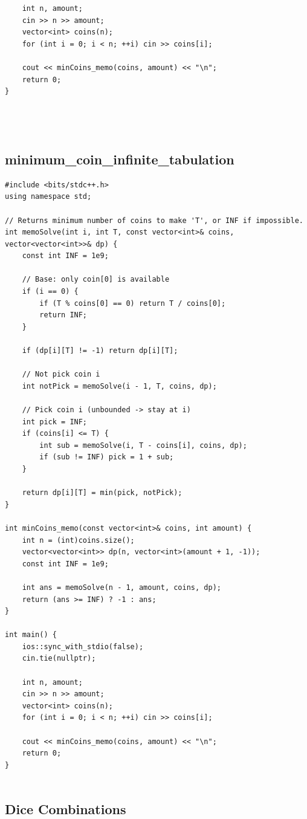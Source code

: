 \documentclass[a4paper,10pt,oneside]{article}
\begin{document}
\begin{multicols*}{\COLS}
\begin{lstlisting}
    int n, amount;
    cin >> n >> amount;
    vector<int> coins(n);
    for (int i = 0; i < n; ++i) cin >> coins[i];

    cout << minCoins_memo(coins, amount) << "\n";
    return 0;
}




\end{lstlisting}

\subsection{minimum_coin_infinite_tabulation}
\begin{lstlisting}
#include <bits/stdc++.h>
using namespace std;

// Returns minimum number of coins to make 'T', or INF if impossible.
int memoSolve(int i, int T, const vector<int>& coins, vector<vector<int>>& dp) {
    const int INF = 1e9;

    // Base: only coin[0] is available
    if (i == 0) {
        if (T % coins[0] == 0) return T / coins[0];
        return INF;
    }

    if (dp[i][T] != -1) return dp[i][T];

    // Not pick coin i
    int notPick = memoSolve(i - 1, T, coins, dp);

    // Pick coin i (unbounded -> stay at i)
    int pick = INF;
    if (coins[i] <= T) {
        int sub = memoSolve(i, T - coins[i], coins, dp);
        if (sub != INF) pick = 1 + sub;
    }

    return dp[i][T] = min(pick, notPick);
}

int minCoins_memo(const vector<int>& coins, int amount) {
    int n = (int)coins.size();
    vector<vector<int>> dp(n, vector<int>(amount + 1, -1));
    const int INF = 1e9;

    int ans = memoSolve(n - 1, amount, coins, dp);
    return (ans >= INF) ? -1 : ans;
}

int main() {
    ios::sync_with_stdio(false);
    cin.tie(nullptr);

    int n, amount;
    cin >> n >> amount;
    vector<int> coins(n);
    for (int i = 0; i < n; ++i) cin >> coins[i];

    cout << minCoins_memo(coins, amount) << "\n";
    return 0;
}


\end{lstlisting}
\subsection{Dice Combinations}
\begin{lstlisting}



\end{lstlisting}
\end{multicols*}
\end{document}
